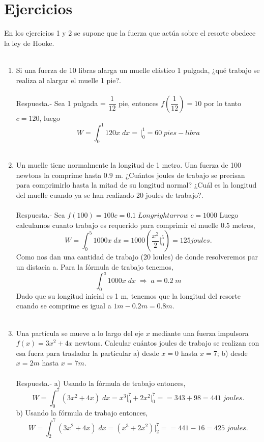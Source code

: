 \section{Ejercicios}
En los ejercicios 1 y 2 se supone que la fuerza que actúa sobre el resorte obedece la ley de Hooke.\\\\

\begin{enumerate}[ \bfseries 1.]

    \item Si una fuerza de 10 libras alarga un muelle elástico 1 pulgada, ¿qué trabajo se realiza al alargar el muelle 1 pie?.\\\\
	Respuesta.-\; Sea 1 pulgada = $\dfrac{1}{12}$ pie, entonces $f\left(\dfrac{1}{12}\right) = 10$ por lo tanto $c=120$, luego 
	$$W=\int_0^1 120x\; dx = \dfrac{}{}\bigg|_0^1 = 60\; pies-libra$$\\

    \item Un muelle tiene normalmente la longitud de 1 metro. Una fuerza de 100 newtons la comprime hasta $0.9$ m. ¿Cuántos joules de trabajo se precisan para comprimirlo hasta la mitad de su longitud normal? ¿Cuál es la longitud del muelle cuando ya se han realizado 20 joules de trabajo?.\\\\
	Respuesta.-\; Sea $f(100) = 100c = 0.1\; Longrightarrow \; c=1000$
	Luego calculamos cuanto trabajo es requerido para comprimir el muelle 0.5 metros,
	$$W = \int_0^5 1000x\; dx = 1000\left(\dfrac{x^2}{2}\bigg|_0^5\right) = 125 joules.$$
	Como nos dan una cantidad de trabajo (20 loules) de donde resolveremos par un distacia a. Para la fórmula de trabajo tenemos,
	$$\int_0^a 1000x\; dx \; \Longrightarrow \; a=0.2\;m$$
	Dado que su longitud inicial es 1 m, tenemos que la longitud del resorte cuando se comprime es igual a $1m-0.2m = 0.8m$.\\\\

    \item Una partícula se mueve a lo largo del eje $x$ mediante una fuerza impulsora $f(x)=3x^2+4x$ newtons. Calcular cuántos joules de trabajo se realizan con esa fuera para trasladar la particular a) desde $x=0$ hasta $x=7$; b) desde $x=2m$ hasta $x=7m$.\\\\
	Respuesta.-\; a) Usando la fórmula de trabajo entonces,
	$$W=\int_0^7 (3x^2+4x)\; dx = x^3\bigg|_0^7 + 2x^2\bigg|_0^7 = = 343+98=441\; joules.$$
	b) Usando la fórmula de trabajo entonces,
	$$W=\int_2^7 (3x^2+4x)\; dx = (x^3 + 2x^2)\bigg|_2^7 = = 441 - 16 = 425\; joules.$$\\\\



\end{enumerate}
